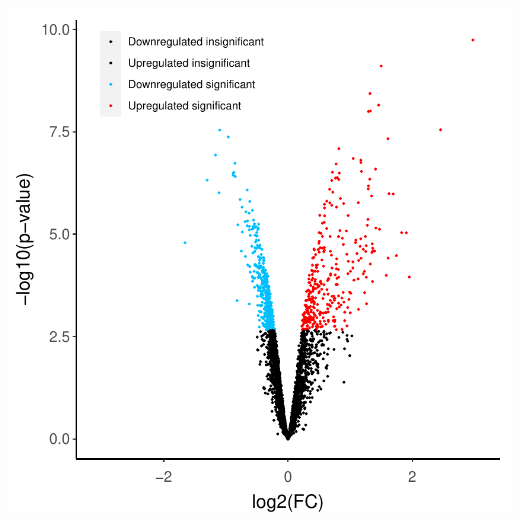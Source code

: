 \documentclass[9pt,a4paper,]{extarticle}
\begin{document}
\begin{center}\includegraphics[height=0.4\textheight]{workflow_expressions_files/figure-latex/volcano_plot-1} \end{center}
\end{document}
